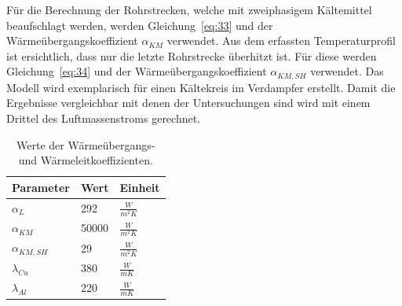 Für die Berechnung der Rohrstrecken, welche mit zweiphasigem Kältemittel beaufschlagt werden, werden Gleichung~\ref{eq:33} und der Wärmeübergangskoeffizient $\alpha_{KM}$ verwendet. Aus dem erfassten Temperaturprofil ist ersichtlich, dass nur die letzte Rohrstrecke überhitzt ist. Für diese werden Gleichung~\ref{eq:34} und der Wärmeübergangskoeffizient $\alpha_{KM,SH}$ verwendet. \newline
Das Modell wird exemplarisch für einen Kältekreis im Verdampfer erstellt. Damit die Ergebnisse vergleichbar mit denen der Untersuchungen sind wird mit einem Drittel des Luftmassenstroms gerechnet. 

\begin{table}[h!]
\centering
\caption{Werte der Wärmeübergangs- und Wärmeleitkoeffizienten.}
\label{tab:Werte der Wärmeübergangs- und Wärmeleitzahlen}
\renewcommand{\arraystretch}{1.2}
\begin{tabular}{|l|l|l|}

\hline
Parameter        & Wert  & Einheit           \\ \hline
$\alpha_{L}$     & 292   & $\frac{W}{m^2 K}$ \\
$\alpha_{KM}$    & 50000 & $\frac{W}{m^2 K}$ \\
$\alpha_{KM,SH}$ & 29    & $\frac{W}{m^2 K}$ \\
$\lambda_{Cu}$   & 380   & $\frac{W}{m K}$   \\
$\lambda_{Al}$   & 220   & $\frac{W}{m K}$   \\ \hline
\end{tabular}
\end{table}

